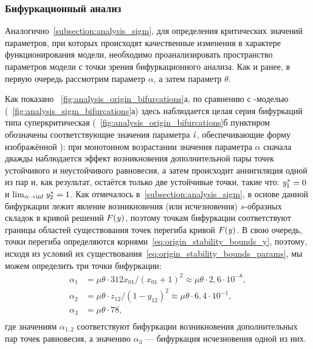 
\subsubsection{Бифуркационный анализ}

Аналогично~\autoref{subsection:analysis_sigm}, для определения критических значений параметров, при которых происходят качественные изменения в характере функционирования модели, необходимо проанализировать пространство параметров модели с точки зрения бифуркационного анализа. Как и ранее, в первую очередь рассмотрим параметр $\alpha$, а затем параметр $\theta$.

Как показано \onfigure~\ref{fig:analysis_origin_bifurcations}а, по сравнению с -моделью (\seefigure~\ref{fig:analysis_sigm_bifurcations}а) здесь наблюдается целая серия бифуркаций типа суперкритическая  (\onfigure~\ref{fig:analysis_origin_bifurcations}б пунктиром обозначены соответствующие значения параметра $\mathit{i}$, обеспечивающие форму изображённой ): при монотонном возрастании значения параметра $\alpha$ сначала дважды наблюдается эффект возникновения дополнительной пары точек устойчивого и неустойчивого равновесия, а затем происходит аннигиляция одной из пар и, как результат, остаётся только две устойчивые точки, такие что: $\mathit{y}^{*}_{1} = 0$ и $\lim_{\alpha \to \inf} \mathit{y}^{*}_{2} = 1$. Как отмечалось в~\autoref{subsection:analysis_sigm}, в основе данной бифуркации лежит явление возникновения (или исчезновения) $s$-образных складок в кривой решений $F(\mathit{y})$, поэтому точкам бифуркации соответствуют границы областей существования точек перегиба кривой $F(\mathit{y})$. В свою очередь, точки перегиба определяются корнями~\eqref{eq:origin_stability_bounds_y}, поэтому, исходя из условий их существования~\eqref{eq:origin_stability_bounds_params}, мы можем определить три точки бифуркации:
\begin{equation}
    \label{eq:origin_bifurcation_alpha}
    \begin{aligned}
        \alpha_{1} &= \mu \theta \cdot 312 x_{01} / (x_{01} + 1)^2 \approx \mu \theta \cdot 2,6 \cdot 10^{-8}, \\
        \alpha_{2} &= \mu \theta \cdot z_{12} / (1 - y_{12})^2 \approx \mu \theta \cdot 6,4 \cdot 10^{-1}, \\
        \alpha_{3} &= \mu \theta \cdot 78,\\
    \end{aligned}
\end{equation}
где значениям $\alpha_{1,2}$ соответствуют бифуркации возникновения дополнительных пар точек равновесия, а значению $\alpha_{3}$ --- бифуркация исчезновения одной из них.

